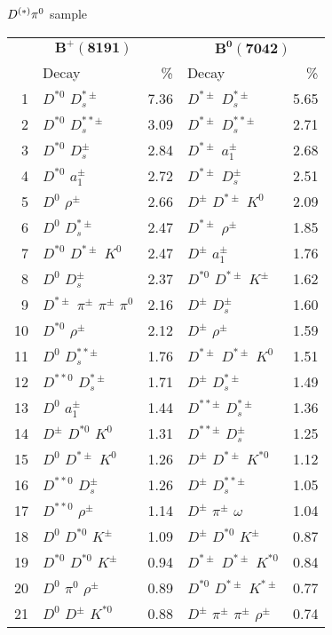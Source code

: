 \documentclass[6pt]{article}
\begin{document}
$D^{(*)}\pi^0$ sample
\begin{tabular}{rlr|lr}
\multicolumn{3}{c|}{$\boldsymbol{B^+(8191)}$} & \multicolumn{2}{c}{$\boldsymbol{B^0(7042)}$} \\
& Decay & \% & Decay & \% \\ \hline \hline
1 & $D^{*0}$ $D_s^{*\pm}$ & 7.36 & $D^{*\pm}$ $D_s^{*\pm}$ & 5.65 \\
2 & $D^{*0}$ $D_s^{**\pm}$ & 3.09 & $D^{*\pm}$ $D_s^{**\pm}$ & 2.71 \\
3 & $D^{*0}$ $D_s^{\pm}$ & 2.84 & $D^{*\pm}$ $a_1^{\pm}$ & 2.68 \\
4 & $D^{*0}$ $a_1^{\pm}$ & 2.72 & $D^{*\pm}$ $D_s^{\pm}$ & 2.51 \\
5 & $D^0$ $\rho^{\pm}$ & 2.66 & $D^{\pm}$ $D^{*\pm}$ $K^0$ & 2.09 \\
6 & $D^0$ $D_s^{*\pm}$ & 2.47 & $D^{*\pm}$ $\rho^{\pm}$ & 1.85 \\
7 & $D^{*0}$ $D^{*\pm}$ $K^0$ & 2.47 & $D^{\pm}$ $a_1^{\pm}$ & 1.76 \\
8 & $D^0$ $D_s^{\pm}$ & 2.37 & $D^{*0}$ $D^{*\pm}$ $K^{\pm}$ & 1.62 \\
9 & $D^{*\pm}$ $\pi^{\pm}$ $\pi^{\pm}$ $\pi^0$ & 2.16 & $D^{\pm}$ $D_s^{\pm}$ & 1.60 \\
10 & $D^{*0}$ $\rho^{\pm}$ & 2.12 & $D^{\pm}$ $\rho^{\pm}$ & 1.59 \\
11 & $D^0$ $D_s^{**\pm}$ & 1.76 & $D^{*\pm}$ $D^{*\pm}$ $K^0$ & 1.51 \\
12 & $D^{**0}$ $D_s^{*\pm}$ & 1.71 & $D^{\pm}$ $D_s^{*\pm}$ & 1.49 \\
13 & $D^0$ $a_1^{\pm}$ & 1.44 & $D^{**\pm}$ $D_s^{*\pm}$ & 1.36 \\
14 & $D^{\pm}$ $D^{*0}$ $K^0$ & 1.31 & $D^{**\pm}$ $D_s^{\pm}$ & 1.25 \\
15 & $D^0$ $D^{*\pm}$ $K^0$ & 1.26 & $D^{\pm}$ $D^{*\pm}$ $K^{*0}$ & 1.12 \\
16 & $D^{**0}$ $D_s^{\pm}$ & 1.26 & $D^{\pm}$ $D_s^{**\pm}$ & 1.05 \\
17 & $D^{**0}$ $\rho^{\pm}$ & 1.14 & $D^{\pm}$ $\pi^{\pm}$ $\omega$ & 1.04 \\
18 & $D^0$ $D^{*0}$ $K^{\pm}$ & 1.09 & $D^{\pm}$ $D^{*0}$ $K^{\pm}$ & 0.87 \\
19 & $D^{*0}$ $D^{*0}$ $K^{\pm}$ & 0.94 & $D^{*\pm}$ $D^{*\pm}$ $K^{*0}$ & 0.84 \\
20 & $D^0$ $\pi^0$ $\rho^{\pm}$ & 0.89 & $D^{*0}$ $D^{*\pm}$ $K^{*\pm}$ & 0.77 \\
21 & $D^0$ $D^{\pm}$ $K^{*0}$ & 0.88 & $D^{\pm}$ $\pi^{\pm}$ $\pi^{\pm}$ $\rho^{\pm}$ & 0.74 \\

\end{tabular}
\end{document}
